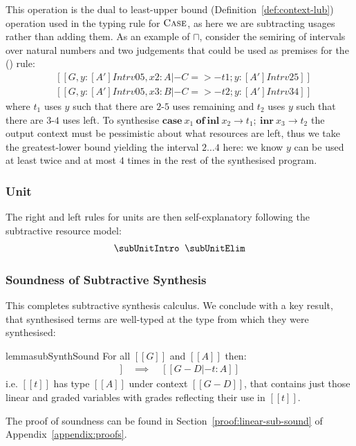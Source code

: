 This operation is the dual to least-upper bound
(Definition~\ref{def:context-lub}) operation used in the typing rule for
$\textsc{Case}$, as here we are subtracting usages rather than adding them. As
an example of $\sqcap$, consider the semiring of intervals over natural numbers
and two judgements that could be used as premises for the (\subSumElimName)
rule:
%
\begin{align*}
& [[ G, y : [A'] Intrv 0 5, x2 : A |- C =>- t1 ; y : [A'] Intrv 2 5 ]] \\
& [[ G, y : [A'] Intrv 0 5, x3 : B |- C =>- t2 ; y : [A'] Intrv 3 4 ]]
\end{align*}
%
where $t_1$ uses $y$ such that there are $2$-$5$ uses remaining
and $t_2$ uses $y$ such that there are $3$-$4$
uses left. To synthesise $\textbf{case} \ x_{1}\ \textbf{of}\ \textbf{inl}\ x_{2} \rightarrow t_{1};\ \textbf{inr}\ x_{3} \rightarrow t_{2}$
the output context must be pessimistic about what resources are left,
thus we take the greatest-lower bound yielding the interval $
2\dots4 $ here: we know $y$ can be used at least twice and at most
$4$ times in the rest of the synthesised program.

\subsubsection{Unit}
The right and left rules for units are then
self-explanatory following the subtractive resource model:
%
\begin{align*}
\begin{array}{c}
  \subUnitIntro
  \;\;
  \subUnitElim
\end{array}
\end{align*}

%

\subsubsection{Soundness of Subtractive Synthesis}
This completes subtractive synthesis calculus. We conclude
with a key result, that synthesised terms are well-typed at the type from which they
were synthesised:
\label{soundness-ref}
%
\begin{restatable}{lemma}{subSynthSound}
\label{lemma:subSynthSound}
For all $[[ G ]]$ and $[[ A ]]$
then:
\begin{align*}
[[ G |- A =>- t ; D ]] \quad \implies \quad [[ G - D |- t : A ]]
\end{align*}
i.e. $[[ t ]]$ has type $[[ A ]]$
under context $[[ G - D ]]$,
that contains just those linear and
graded variables with grades reflecting their use in $[[ t ]]$.
\end{restatable}
The proof of soundness can be found in Section~\ref{proof:linear-sub-sound} of Appendix~\ref{appendix:proofs}. 


